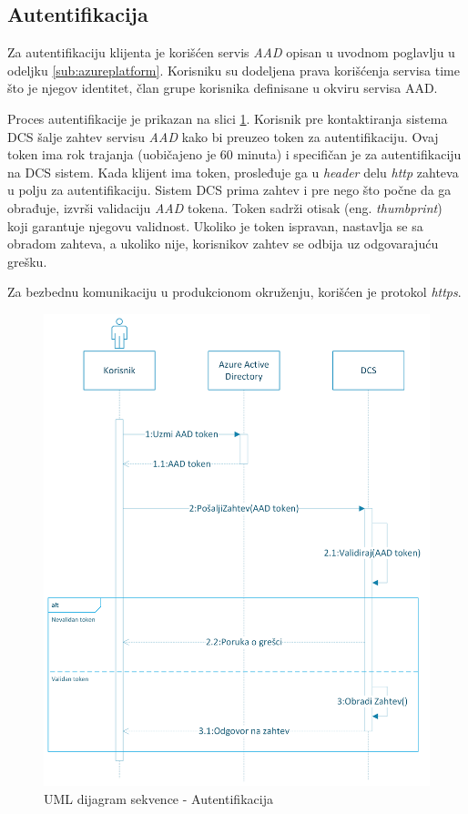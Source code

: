 \documentclass[12pt,oneside]{memoir}
\begin{document}
\subsection{Autentifikacija}

Za autentifikaciju klijenta je korišćen servis \emph{AAD} \cite{AAD} opisan u uvodnom poglavlju u odeljku \ref{sub:azureplatform}. Korisniku su dodeljena prava korišćenja servisa time što je njegov identitet, član grupe korisnika definisane u okviru servisa AAD.

Proces autentifikacije je prikazan na slici \ref{fig:autentifikacija}. Korisnik pre kontaktiranja sistema DCS šalje zahtev servisu \emph{AAD} kako bi preuzeo token za autentifikaciju. Ovaj token ima rok trajanja (uobičajeno je 60 minuta) i specifičan je za autentifikaciju na DCS sistem. Kada klijent ima token, prosleđuje ga u \emph{header} delu \emph{http} zahteva u polju za autentifikaciju. Sistem DCS prima zahtev i pre nego što počne da ga obrađuje, izvrši validaciju \emph{AAD} tokena. Token sadrži otisak (eng. \emph{thumbprint}) koji garantuje njegovu validnost. Ukoliko je token ispravan, nastavlja se sa obradom zahteva, a ukoliko nije, korisnikov zahtev se odbija uz odgovarajuću grešku.

Za bezbednu komunikaciju u produkcionom okruženju, korišćen je protokol \emph{https}.

\begin{figure}[!ht]
  \centering
  \includegraphics[width=1.0\textwidth]{./images/autentikacija_uml_dijagram_sekvence.png}
  \caption{UML dijagram sekvence - Autentifikacija}
  \label{fig:autentifikacija}
\end{figure}
\end{document}
